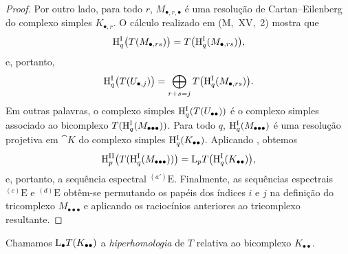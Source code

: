 \begin{proof}
Por outro lado, para todo $r$, $M_{\bullet,r,\bullet}$ é uma
resolução de Cartan--Eilenberg do complexo simples $K_{\bullet,r}$.
O cálculo realizado em (M,~XV,~2) mostra que
\[
  \mathrm{H}^{\mathrm{I}}_q\bigl(T(M_{\bullet,rs})\bigr)
  =
  T\bigl(\mathrm{H}^{\mathrm{I}}_q(M_{\bullet,rs})\bigr),
\]
e, portanto,
\[
  \mathrm{H}^{\mathrm{I}}_q\bigl(T(U_{\bullet,j})\bigr)
  =
  \bigoplus_{r+s=j}
  T\bigl(\mathrm{H}^{\mathrm{I}}_q(M_{\bullet,rs})\bigr).
\]
Em outras palavras, o complexo simples
$\mathrm{H}^{\mathrm{I}}_q(T(U_{\bullet\bullet}))$ é o complexo simples
associado ao bicomplexo
$T(\mathrm{H}^{\mathrm{I}}_q(M_{\bullet\bullet\bullet}))$.
Para todo $q$, $\mathrm{H}^{\mathrm{I}}_q(M_{\bullet\bullet\bullet})$ é uma
resolução projetiva em $\cat{K}$ do complexo simples
$\mathrm{H}^{\mathrm{I}}_q(K_{\bullet\bullet})$.
Aplicando , obtemos
\[
  \mathrm{H}^{\mathrm{II}}_p
  \bigl(T(\mathrm{H}^{\mathrm{I}}_q(M_{\bullet\bullet\bullet}))\bigr)
  =
  \mathrm{L}_pT\bigl(\mathrm{H}^{\mathrm{I}}_q(K_{\bullet\bullet})\bigr),
\]
e, portanto, a sequência espectral ${}^{(a')}\mathrm{E}$.
Finalmente, as sequências espectrais ${}^{(c)}\mathrm{E}$ e
${}^{(d)}\mathrm{E}$ obtêm-se permutando os papéis dos
índices $i$ e $j$ na definição do tricomplexo
$M_{\bullet\bullet\bullet}$ e aplicando os raciocínios anteriores ao
tricomplexo resultante.
\end{proof}

Chamamos $\mathrm{L}_\bullet T(K_{\bullet\bullet})$ a \emph{hiperhomologia} de
$T$ relativa ao bicomplexo $K_{\bullet\bullet}$.

